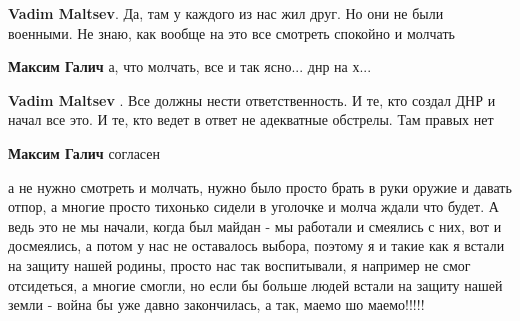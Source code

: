 \textbf{Vadim Maltsev}. Да, там у каждого из нас жил друг. Но они не были военными. Не знаю, как вообще на это все смотреть спокойно и молчать

 
\textbf{Максим Галич} а, что молчать, все и так ясно... днр на х...

 
\textbf{Vadim Maltsev} . Все должны нести ответственность. И те, кто создал ДНР и начал все это. И те, кто ведет в ответ не адекватные обстрелы. Там правых нет

 
\textbf{Максим Галич} согласен

 

а не нужно смотреть и молчать, нужно было просто брать в руки оружие и давать
отпор, а многие просто тихонько сидели в уголочке и молча ждали что будет. А
ведь это не мы начали, когда был майдан - мы работали и смеялись с них, вот и
досмеялись, а потом у нас не оставалось выбора, поэтому я и такие как я встали
на защиту нашей родины, просто нас так воспитывали, я например не смог
отсидеться, а многие смогли, но если бы больше людей встали на защиту нашей
земли - война бы уже давно закончилась, а так, маемо шо маемо!!!!!


 
